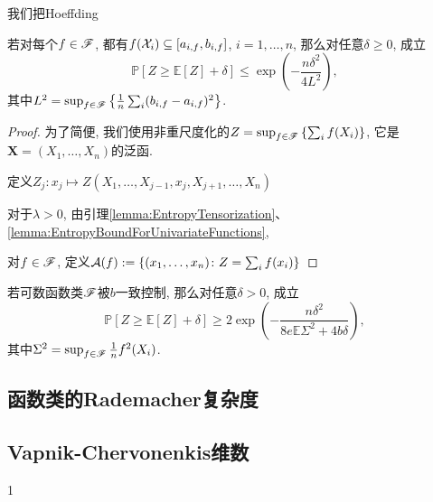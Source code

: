 我们把Hoeffding

\begin{theorem}[泛函Hoeffding不等式]
	若对每个$f \in \mathscr{F}$, 都有$f(\mathcal{X}_i) \subseteq  [a_{i, f}, b_{i, f}]$, $i = 1, \dots, n$,  那么对任意$\delta \geq 0$, 成立
	\begin{equation}
		\mathbb{P}[ Z \geq \mathbb{E}[Z] + \delta] 
		\leq \exp \left( - \frac{n \delta^2}{4 L^2} \right), 
	\end{equation}
	其中$L^2 = \sup_{f \in \mathscr{F}} \left\{ \frac{1}{n} \sum_i (b_{i, f} - a_{i, f})^2 \right\}$. 
\end{theorem}

\begin{proof}
	为了简便, 我们使用非重尺度化的$Z = \sup_{f \in \mathscr{F}} \left\{ \sum_i f(X_i) \right\}$, 它是$\bm X = (X_1, \dots, X_n)$的泛函.  
	
	定义$Z_j \colon x_j \mapsto Z(X_1, \dots, X_{j-1}, x_j, X_{j+1}, \dots, X_n)$
	
	对于$\lambda > 0$, 由引理\ref{lemma:EntropyTensorization}、 \ref{lemma:EntropyBoundForUnivariateFunctions}, 
	
	对$f \in \mathscr{F}$, 定义$\mathcal{A}(f) := \left\{ (x_1, \dots, x_n) \colon Z = \sum_i f(x_i) \right\}$
\end{proof}


\begin{theorem}[经验过程的Talagrand集中度]
	若可数函数类$\mathscr{F}$被$b$一致控制, 那么对任意$\delta > 0$, 成立
	\begin{equation*}
		\mathbb{P}[ Z \geq \mathbb{E}[Z] + \delta] 
		\geq 2 \exp \left( - \frac{n \delta^2}{8 e \mathbb{E} \Sigma^2 + 4 b \delta} \right), 
	\end{equation*}
	其中$\Sigma^2 = \sup_{f \in \mathscr{F}} \frac1n f^2(X_i)$. 
\end{theorem}

\subsection{函数类的Rademacher复杂度}

























\subsection{Vapnik-Chervonenkis维数}































1